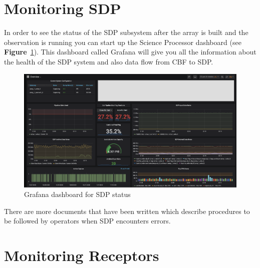 \section{ Monitoring SDP}

In order to see the status of the SDP subsystem after the array is built and the observation is running you can  start up the Science Processor dashboard (see \textbf{Figure}~\ref{fig:image123}). This dashboard called Grafana will give you all the information about the health of the SDP system and also data flow from CBF to SDP. 



\begin{figure}[H]
	\centering
	\includegraphics[scale=0.23]{Chapters/images/image123.png}
	
	\caption{Grafana dashboard for SDP status}
	\label{fig:image123}
\end{figure}


There are more documents that have been written which describe procedures to be followed by operators when SDP encounters errors. 

\section{Monitoring Receptors}

